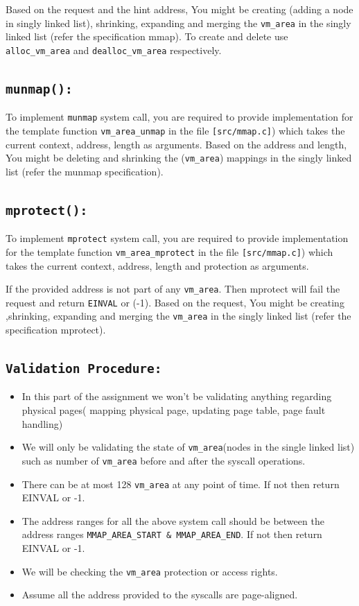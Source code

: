 \documentclass[12pt]{article}
\begin{document}
    Based on the request and the hint address, You might be creating (adding a node in singly linked list), shrinking, expanding and merging the {\tt vm\_area} in the singly linked list (refer the specification mmap). To create and delete use {\tt alloc\_vm\_area} and {\tt dealloc\_vm\_area} respectively.
    
\subsection*{\tt munmap():}
     To implement {\tt munmap} system call, you are required to provide implementation for the template function {\tt vm\_area\_unmap} in the file {\tt [src/mmap.c]}) which takes the current context, address, length as arguments. Based on the address and length, You might be deleting and shrinking the ({\tt vm\_area}) mappings in the singly linked list (refer the munmap specification).
     
\subsection*{\tt mprotect():}

      To implement {\tt mprotect} system call, you are required to provide implementation for the template function {\tt vm\_area\_mprotect} in the file {\tt [src/mmap.c]}) which takes the current context, address, length and protection as arguments. 
      
      If the provided address is not part of any {\tt vm\_area}. Then mprotect will fail the request and return {\tt EINVAL} or (-1). Based on the request, You might be creating ,shrinking, expanding and merging the {\tt vm\_area} in the singly linked list (refer the specification mprotect).

\subsection*{\tt Validation Procedure:}

    \begin{itemize}
        \item In this part of the assignment we won't be validating anything regarding physical pages( mapping physical page, updating page table, page fault handling)
        \item We will only be validating the state of {\tt vm\_area}(nodes in the single linked list) such as number of {\tt vm\_area} before and after the syscall operations.
        \item There can be at most 128 {\tt vm\_area} at any point of time. If not then return EINVAL or -1.
        \item The address ranges for all the above system call should be between the address ranges {\tt MMAP\_AREA\_START \& MMAP\_AREA\_END}. If not then return EINVAL or -1.
        \item We will be checking the {\tt vm\_area} protection or access rights.
        \item Assume all the address provided to the syscalls are page-aligned.
         
    \end{itemize}
\end{document}
